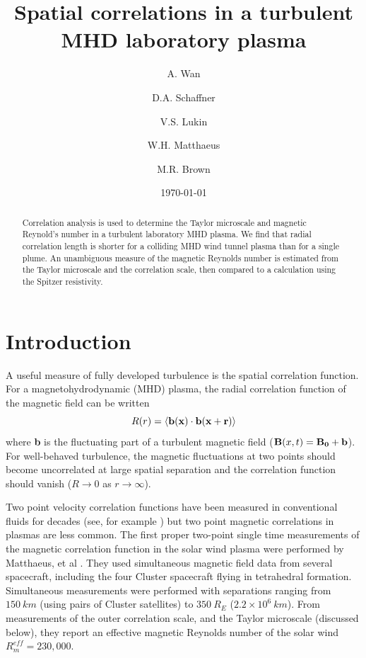 \documentclass[aip,prl,amsmath,amssymb,reprint,superscriptaddress]{revtex4-1} %
\begin{document}
\title{Spatial correlations in a turbulent MHD laboratory plasma}

\author{A. Wan}
\author{D.A. Schaffner}
\author{V.S. Lukin}
\author{W.H. Matthaeus}
\author{M.R. Brown}
\date{\today}
\begin{abstract}
Correlation analysis is used to determine the Taylor microscale and magnetic Reynold's number in a turbulent laboratory MHD plasma.  We find that radial correlation length is shorter for a colliding MHD wind tunnel plasma than for a single plume.  An unambiguous measure of the magnetic Reynolds number is estimated from the Taylor microscale and the correlation scale, then compared to a calculation using the Spitzer resistivity.
\end{abstract}

\maketitle

\section{Introduction}

A useful measure of fully developed turbulence is the spatial correlation function.  For a magnetohydrodynamic (MHD) plasma, the radial correlation function of the magnetic field can be written
%
\begin{equation}
R(r) =  \langle {\bf b(x) \cdot b(x + r)} \rangle
\label{eq:correlation1}
\end{equation}
%
where {\bf b} is the fluctuating part of a turbulent magnetic field (${\bf B}(x, t) = {\bf B_0 + b}$).  For well-behaved turbulence, the magnetic fluctuations at two points should become uncorrelated at large spatial separation and the correlation function should vanish ($R \rightarrow 0$ as $r \rightarrow \infty$).  

Two point velocity correlation functions have been measured in conventional fluids for decades (see, for example \cite{frisch95}) but two point magnetic correlations in plasmas are less common.  The first proper two-point single time measurements of the magnetic correlation function in the solar wind plasma were performed by Matthaeus, et al \cite{Matthaeus05}.  They used simultaneous magnetic field data from several spacecraft, including the four Cluster spacecraft flying in tetrahedral formation.  Simultaneous measurements were performed with separations ranging from $150~km$ (using pairs of Cluster satellites) to $350~R_E$ ($2.2 \times 10^6~km$).  From measurements of the outer correlation scale, and the Taylor microscale (discussed below), they report an effective magnetic Reynolds number of the solar wind $R_m^{eff}  = 230,000$.
\end{document}
